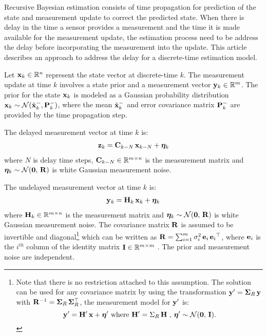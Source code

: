 

Recursive Bayesian estimation consists of time propagation for prediction of the state and measurement update to correct the predicted state.
When there is delay in the time a sensor provides a measurement and the time it is made available for the measurement update, the estimation process need to be address the delay before incorporating the measurement into the update.
This article describes an approach to address the delay for a discrete-time estimation model.

Let $\mathbf{x}_k \in\mathbb{R}^n$ represent the state vector at discrete-time $k$.
The measurement update at time $k$ involves a state prior and a measurement vector $\mathbf{y}_k\in\mathbb{R}^m$.
%
The prior for the state $\mathbf{x}_k$ is modeled as a Gaussian probability distribution $\mathbf{x}_k \sim \mathcal{N}(\hat{\mathbf{x}}_k^-,\mathbf{P}_k^-)$, where the mean $\hat{\mathbf{x}}_k^-$ and error covariance matrix $\mathbf{P}_k^-$ are provided by the time propagation step.
  
The delayed measurement vector at time $k$ is:
\begin{align} \label{eqn:MeasurementModel}
	\mathbf{z}_{k} = \mathbf{C}_{k-N} \, \mathbf{x}_{k-N} + \boldsymbol{\eta}_k
\end{align}
where $N$ is delay time steps, $\mathbf{C}_{k-N}\in \mathbb{R}^{m \times n}$ is the measurement matrix and $\boldsymbol{\eta}_k \sim \mathcal{N}(\boldsymbol{0},\,\mathbf{R})$ is white Gaussian measurement noise.

The undelayed measurement vector at time $k$ is:
\begin{align} \label{eqn:MeasurementModel}
\mathbf{y}_k = \mathbf{H}_k \, \mathbf{x}_k + \boldsymbol{\eta}_k
\end{align}
where $\mathbf{H}_k \in \mathbb{R}^{m \times n}$ is the measurement matrix and $\boldsymbol{\eta}_k \sim \mathcal{N}(\boldsymbol{0},\,\mathbf{R})$ is white Gaussian measurement noise. The covariance matrix $\mathbf{R}$ is assumed to be invertible and diagonal\footnote
{\label{ftnt:R_assumption}
	Note that there is no restriction attached to this assumption. The solution can be used for any  covariance matrix by using the transformation $\mathbf{y}' =\boldsymbol{\Sigma}_R  \, \mathbf{y}$ with $\mathbf{R}^{-1} = \boldsymbol{\Sigma}_R \, \boldsymbol{\Sigma}_R^\top$, the measurement model for $\mathbf{y}'$ is:
	$$\mathbf{y}'=\mathbf{H}' \,\mathbf{x}+\boldsymbol{\eta}' \mbox{ where } \mathbf{H}' = \Sigma_R  \, \mathbf{H} \mbox{ , } \boldsymbol{\eta}' \sim \mathcal{N}(\boldsymbol{0},\,\mathbf{I}).$$
} 
which can be written as $\mathbf{R} = \sum_{i=1}^{m} \sigma_{i}^2 \, \mathbf{e}_i  \,{\mathbf{e}_i}^\top$, where $\mathbf{e}_i$ is the $i^{th}$ column of the identity matrix $\mathbf{I} \in \mathbb{R}^{m \times m}$ .
The prior and measurement noise are independent.

